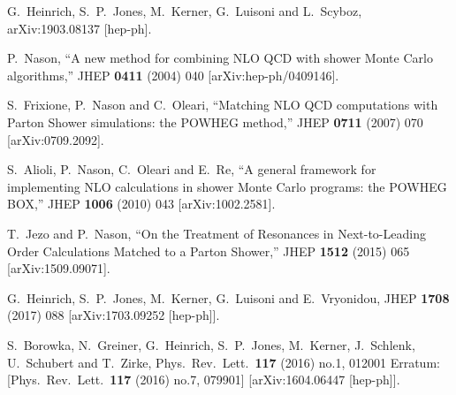 \documentclass[paper]{JHEP3}
\begin{document}
\begin{thebibliography}{10}

  G.~Heinrich, S.~P.~Jones, M.~Kerner, G.~Luisoni and L.~Scyboz,
  arXiv:1903.08137 [hep-ph].

  P.~Nason,
  ``A new method for combining NLO QCD with shower Monte Carlo algorithms,''
  JHEP {\bf 0411} (2004) 040
  [arXiv:hep-ph/0409146].

  S.~Frixione, P.~Nason and C.~Oleari,
  ``Matching NLO QCD computations with Parton Shower simulations: the POWHEG method,''
  JHEP {\bf 0711} (2007) 070
  [arXiv:0709.2092].

  S.~Alioli, P.~Nason, C.~Oleari and E.~Re,
  ``A general framework for implementing NLO calculations in shower Monte Carlo programs: the POWHEG BOX,''
  JHEP {\bf 1006} (2010) 043
  [arXiv:1002.2581].

  T.~Jezo and P.~Nason,
  ``On the Treatment of Resonances in Next-to-Leading Order Calculations Matched to a Parton Shower,''
  JHEP {\bf 1512} (2015) 065
  [arXiv:1509.09071].

  


  G.~Heinrich, S.~P.~Jones, M.~Kerner, G.~Luisoni and E.~Vryonidou,
  JHEP {\bf 1708} (2017) 088
  [arXiv:1703.09252 [hep-ph]].

  S.~Borowka, N.~Greiner, G.~Heinrich, S.~P.~Jones, M.~Kerner, J.~Schlenk, U.~Schubert and T.~Zirke,
  Phys.\ Rev.\ Lett.\  {\bf 117} (2016) no.1,  012001
   Erratum: [Phys.\ Rev.\ Lett.\  {\bf 117} (2016) no.7,  079901]
  [arXiv:1604.06447 [hep-ph]].


\end{thebibliography}
\end{document}
